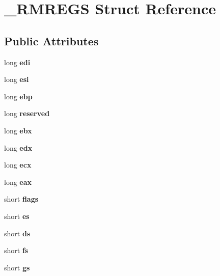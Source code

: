 \section{\-\_\-\-R\-M\-R\-E\-G\-S Struct Reference}
\label{struct__RMREGS}
\subsection*{Public Attributes}
\begin{DoxyCompactItemize}
\item 
long {\bfseries edi}\label{struct__RMREGS_af0ec09de475e8e75f1c4aa67120b19cd}

\item 
long {\bfseries esi}\label{struct__RMREGS_ae7d8472fe9c2e3523b5eda6e83af7439}

\item 
long {\bfseries ebp}\label{struct__RMREGS_a8c1f828375f855cd53cc67d2c5b76dce}

\item 
long {\bfseries reserved}\label{struct__RMREGS_a8b485c4de64310b8bfa4d9ffb2a9e6d6}

\item 
long {\bfseries ebx}\label{struct__RMREGS_a550f79363b38f49e1cfbd083fef4f0c1}

\item 
long {\bfseries edx}\label{struct__RMREGS_a3599af387604b17cb2a270102c13a1d0}

\item 
long {\bfseries ecx}\label{struct__RMREGS_aba1881593e4bb26d52c816d4e1e7008c}

\item 
long {\bfseries eax}\label{struct__RMREGS_aa897fa3adeb9738897b4cca81be982eb}

\item 
short {\bfseries flags}\label{struct__RMREGS_a6a920d7592cbd7b32317a0dcbb47d9c3}

\item 
short {\bfseries es}\label{struct__RMREGS_adb7cbb581b2e60d61bb8ab8603df7eef}

\item 
short {\bfseries ds}\label{struct__RMREGS_a685e114842240ba430b2993991075022}

\item 
short {\bfseries fs}\label{struct__RMREGS_a357d3116033c738e5705d5e03e6b3ca6}

\item 
short {\bfseries gs}\label{struct__RMREGS_a4a07e2e1665f09fc8fb03d6eb120cce2}


\end{DoxyCompactItemize}
